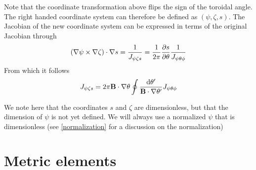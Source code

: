 \documentclass{report}
\def\be{\begin{equation}}
\def\ee{\end{equation}}
\begin{document}
Note that the coordinate transformation above flips the sign of the toroidal angle. 
The right handed coordinate system can therefore be defined as $(\psi,\zeta,s)$. 
The Jacobian of the new coordinate system can be expressed in terms of the original 
Jacobian through 
\be 
(\nabla \psi \times \nabla \zeta) \cdot \nabla s = {1 \over J_{\psi  \zeta s} } = 
{1\over 2 \pi}{\partial s \over \partial \theta} {1 \over J_{\psi \theta \phi}} 
\ee 
From which it follows 
\be 
J_{\psi  \zeta s} = 2\pi {\bf B} \cdot \nabla \theta \oint {{\rm d} \theta^\prime \over 
{{\bf B} \cdot \nabla \theta^\prime}} J_{\psi \theta \phi} 
\ee 



We note here that the coordinates $s$ and $\zeta$ are dimensionless, but that the 
dimension of $\psi$ is not yet defined. We will always use a normalized $\psi$ that 
is dimensionless (see \ref{normalization} for a discussion on the normalization) 

\section{Metric elements} 
\end{document}
